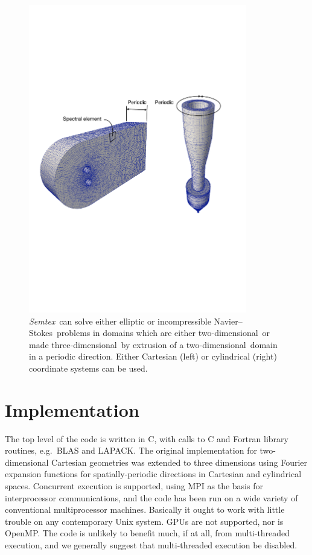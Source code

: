 \documentclass[11pt]{report}
\newcommand{\Semtex}{\emph{Semtex}} \newcommand{\Dog}{\emph{Dog}}
\newcommand\twod{two-di\-men\-sion\-al}
\newcommand\threed{three-di\-men\-sion\-al}
\newcommand{\eg}{e.g.\ } \newcommand{\CC}{\mathrm{c.c.}}
\newcommand\NavSto{Navier--Stokes}
\newcommand\cpp{C\nolinebreak\hspace{-.05em}\raisebox{.3ex}{\footnotesize\bf
+}\nolinebreak\hspace{-.10em}\raisebox{.3ex}{\footnotesize\bf+}}
\begin{document}
\begin{figure}
  \begin{center}
    \includegraphics[width=0.85\textwidth]{2+5DSemMesh}
  \end{center}
  \caption{ \Semtex\ can solve either elliptic or incompressible
    \NavSto\ problems in domains which are either \twod\ or made
    \threed\ by extrusion of a \twod\ domain in a periodic direction.
    Either Cartesian (left) or cylindrical (right) coordinate systems
    can be used.  }
  \label{fig.extrude}
\end{figure}


\section{Implementation}

The top level of the code is written in \cpp, with calls to C and
Fortran library routines, \eg BLAS and LAPACK. The original
implementation for two-dimensional Cartesian geometries was extended
to three dimensions using Fourier expansion functions for
spatially-periodic directions in Cartesian and cylindrical spaces.
Concurrent execution is supported, using MPI as the basis for
interprocessor communications, and the code has been run on a wide
variety of conventional multiprocessor machines.  Basically it ought
to work with little trouble on any contemporary Unix system.  GPUs are
not supported, nor is OpenMP.  The code is unlikely to benefit much,
if at all, from multi-threaded execution, and we generally suggest
that multi-threaded execution be disabled.
\end{document}
